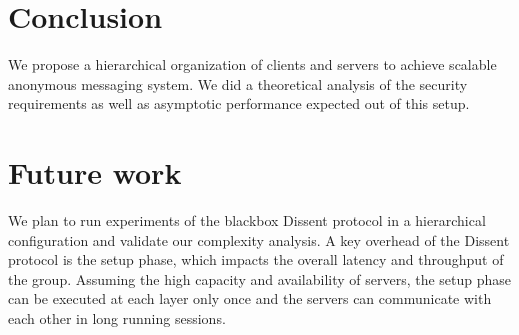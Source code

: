 \section{Conclusion}
\label{sec:conclusion}
We propose a hierarchical organization of clients and servers to achieve scalable anonymous messaging system. We did a theoretical analysis of the security requirements as well as asymptotic performance expected out of this setup.

\section{Future work}
\label{sec:future}
We plan to run experiments of the blackbox Dissent protocol in a hierarchical configuration and validate our complexity analysis. A key overhead of the Dissent protocol is the setup phase, which impacts the overall latency and throughput of the group. Assuming the high capacity and availability of servers, the setup phase can be executed at each layer only once and the servers can communicate with each other in long running sessions.
